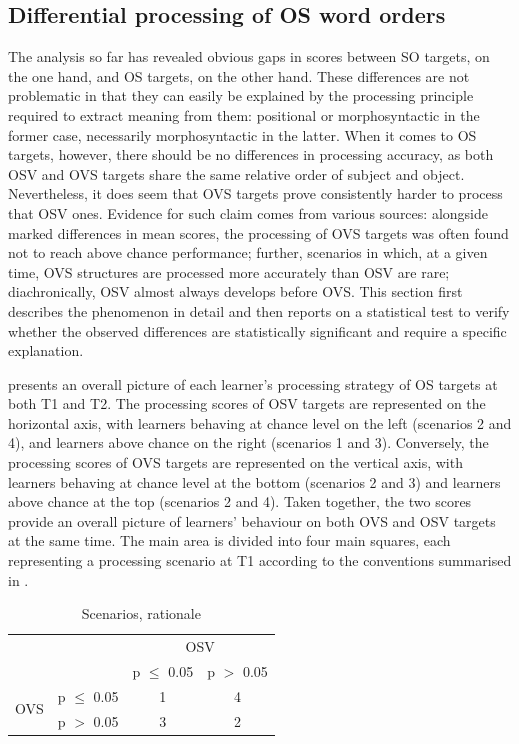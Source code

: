 \subsection{Differential processing of OS word orders}\label{sec:05:2.5}

The analysis so far has revealed obvious gaps in scores between SO targets, on the one hand, and OS targets, on the other hand. These differences are not problematic in that they can easily be explained by the processing principle required to extract meaning from them: positional or morphosyntactic in the former case, necessarily morphosyntactic in the latter. When it comes to OS targets, however, there should be no differences in processing accuracy, as both OSV and OVS targets share the same relative order of subject and object. Nevertheless, it does seem that OVS targets prove consistently harder to process that OSV ones. Evidence for such claim comes from various sources: alongside marked differences in mean scores, the processing of OVS targets was often found not to reach above chance performance; further, scenarios in which, at a given time, OVS structures are processed more accurately than OSV are rare; diachronically, OSV almost always develops before OVS. This section first describes the phenomenon in detail and then reports on a statistical test to verify whether the observed differences are statistically significant and require a specific explanation.

 presents an overall picture of each learner's processing strategy of OS targets at both T1 and T2. The processing scores of OSV targets are represented on the horizontal axis, with learners behaving at chance level on the left (scenarios 2 and 4), and learners above chance on the right (scenarios 1 and 3). Conversely, the processing scores of OVS targets are represented on the vertical axis, with learners behaving at chance level at the bottom (scenarios 2 and 3) and learners above chance at the top (scenarios 2 and 4). Taken together, the two scores provide an overall picture of learners' behaviour on both OVS and OSV targets at the same time. The main area is divided into four main squares, each representing a processing scenario at T1 according to the conventions summarised in .

\begin{table}
    \begin{tabular}{|lc|cc|}
    \hline
    & & \multicolumn{2}{c|}{OSV}\\
    &  & p ${\leq}$ 0.05 & p $>$ 0.05\\
    \hline
    \multirow{2}{*}{OVS} & p ${\leq}$ 0.05 & 1 & 4\\
                         & p $>$ 0.05 & 3 & 2\\
    \hline
    \end{tabular}
    \caption{Scenarios, rationale}
    \label{tab:05:6}
\end{table}

